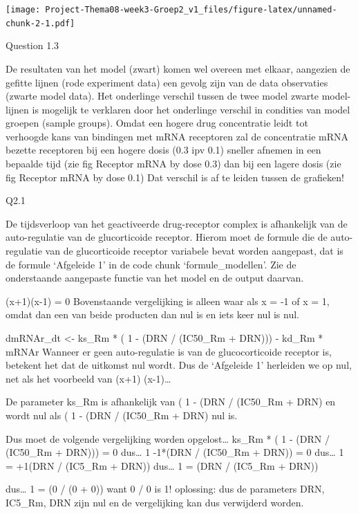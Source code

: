 \documentclass[
]{article}
\begin{document}
\texttt{[image: Project-Thema08-week3-Groep2\_v1\_files/figure-latex/unnamed-chunk-2-1.pdf]}

Question 1.3

De resultaten van het model (zwart) komen wel overeen met elkaar,
aangezien de gefitte lijnen (rode experiment data) een gevolg zijn van
de data observaties (zwarte model data). Het onderlinge verschil tussen
de twee model zwarte model-lijnen is mogelijk te verklaren door het
onderlinge verschil in condities van model groepen (sample groups).
Omdat een hogere drug concentratie leidt tot verhoogde kans van
bindingen met mRNA receptoren zal de concentratie mRNA bezette
receptoren bij een hogere dosis (0.3 ipv 0.1) sneller afnemen in een
bepaalde tijd (zie fig Receptor mRNA by dose 0.3) dan bij een lagere
dosis (zie fig Receptor mRNA by dose 0.1) Dat verschil is af te leiden
tussen de grafieken!

Q2.1

De tijdsverloop van het geactiveerde drug-receptor complex is
afhankelijk van de auto-regulatie van de glucorticoide receptor. Hierom
moet de formule die de auto-regulatie van de glucorticoide receptor
variabele bevat worden aangepast, dat is de formule `Afgeleide 1' in de
code chunk `formule\_modellen'. Zie de onderstaande aangepaste functie
van het model en de output daarvan.

(x+1)(x-1) = 0 Bovenstaande vergelijking is alleen waar als x = -1 of x
= 1, omdat dan een van beide producten dan nul is en iets keer nul is
nul.

dmRNAr\_dt \textless- ks\_Rm * ( 1 - (DRN / (IC50\_Rm + DRN))) - kd\_Rm
* mRNAr Wanneer er geen auto-regulatie is van de glucocorticoide
receptor is, betekent het dat de uitkomst nul wordt. Dus de `Afgeleide
1' herleiden we op nul, net als het voorbeeld van (x+1) (x-1)\ldots{}

De parameter ks\_Rm is afhankelijk van ( 1 - (DRN / (IC50\_Rm + DRN) en
wordt nul als ( 1 - (DRN / (IC50\_Rm + DRN) nul is.

Dus moet de volgende vergelijking worden opgelost\ldots{} ks\_Rm * ( 1 -
(DRN / (IC50\_Rm + DRN))) = 0 dus\ldots{} 1 -1*(DRN / (IC50\_Rm + DRN))
= 0 dus\ldots{} 1 = +1(DRN / (IC5\_Rm + DRN)) dus\ldots{} 1 = (DRN /
(IC5\_Rm + DRN))

dus\ldots{} 1 = (0 / (0 + 0)) want 0 / 0 is 1! oplossing: dus de
parameters DRN, IC5\_Rm, DRN zijn nul en de vergelijking kan dus
verwijderd worden.
\end{document}

